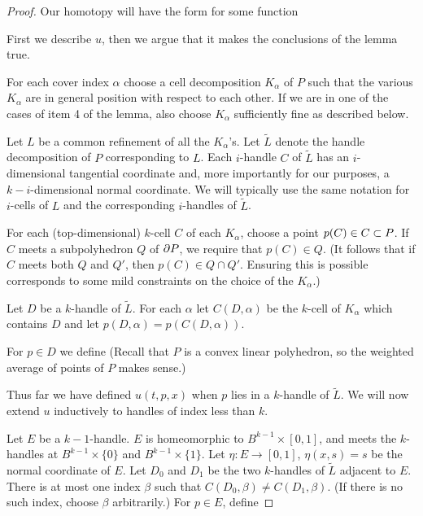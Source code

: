 
\begin{proof}
Our homotopy will have the form
for some function

First we describe $u$, then we argue that it makes the conclusions of the lemma true.

For each cover index $\alpha$ choose a cell decomposition $K_\alpha$ of $P$
such that the various $K_\alpha$ are in general position with respect to each other.
If we are in one of the cases of item 4 of the lemma, also choose $K_\alpha$
sufficiently fine as described below.

\def\jj{\tilde{L}}
Let $L$ be a common refinement of all the $K_\alpha$'s.
Let $\jj$ denote the handle decomposition of $P$ corresponding to $L$.
Each $i$-handle $C$ of $\jj$ has an $i$-dimensional tangential coordinate and,
more importantly for our purposes, a $k{-}i$-dimensional normal coordinate.
We will typically use the same notation for $i$-cells of $L$ and the 
corresponding $i$-handles of $\jj$.

For each (top-dimensional) $k$-cell $C$ of each $K_\alpha$, choose a point $p(C) \in C \subset P$.
If $C$ meets a subpolyhedron $Q$ of $\partial P$, we require that $p(C)\in Q$.
(It follows that if $C$ meets both $Q$ and $Q'$, then $p(C)\in Q\cap Q'$.
Ensuring this is possible corresponds to some mild constraints on the choice of the $K_\alpha$.)

Let $D$ be a $k$-handle of $\jj$.
For each $\alpha$ let $C(D, \alpha)$ be the $k$-cell of $K_\alpha$ which contains $D$
and let $p(D, \alpha) = p(C(D, \alpha))$.

For $p \in D$ we define
(Recall that $P$ is a convex linear polyhedron, so the weighted average of points of $P$
makes sense.)

Thus far we have defined $u(t, p, x)$ when $p$ lies in a $k$-handle of $\jj$.
We will now extend $u$ inductively to handles of index less than $k$.

Let $E$ be a $k{-}1$-handle.
$E$ is homeomorphic to $B^{k-1}\times [0,1]$, and meets
the $k$-handles at $B^{k-1}\times\{0\}$ and $B^{k-1}\times\{1\}$.
Let $\eta : E \to [0,1]$, $\eta(x, s) = s$ be the normal coordinate
of $E$.
Let $D_0$ and $D_1$ be the two $k$-handles of $\jj$ adjacent to $E$.
There is at most one index $\beta$ such that $C(D_0, \beta) \ne C(D_1, \beta)$.
(If there is no such index, choose $\beta$
arbitrarily.)
For $p \in E$, define



\end{proof}
